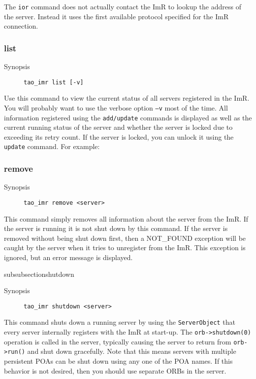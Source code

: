 \begin{itemize}
{\begin{itemize}
{{The {\tt ior} command does not actually contact the ImR to lookup the address 
of the server. Instead it uses the first available protocol specified for the 
ImR connection.

\subsubsection{list}

\begin{description}
    \item [Synopsis] {\tt tao\_imr list [-v]}
\end{description}

Use this command to view the current status of all servers registered 
in the ImR. You will probably want to use the verbose option {\tt–v}
 most of the time. All information registered using the {\tt add/update} 
commands is displayed as well as the current running status of the 
server and whether the server is locked due to exceeding its retry count. 
If the server is locked, you can unlock it using the {\tt update} command. 
For example:


\subsubsection{remove}

\begin{description}
    \item [Synopsis] {\tt tao\_imr remove <server>}
\end{description}

This command simply removes all information about the server from the ImR. 
If the server is running it is not shut down by this command. If the server is 
removed without being shut down first, then a NOT_FOUND exception will 
be caught by the server when it tries to unregister from the ImR. This exception 
is ignored, but an error message is displayed.

subsubsection{shutdown}

\begin{description}
    \item [Synopsis] {\tt tao\_imr shutdown <server>}
\end{description}

This command shuts down a running server by using the {\tt ServerObject} 
that every server internally registers with the ImR at start-up. The 
{\tt orb->shutdown(0)} operation is called in the server, typically causing 
the server to return from {\tt orb->run()} and shut down gracefully. Note 
that this means servers with multiple persistent POAs can be shut down 
using any one of the POA names. If this behavior is not desired, then you 
should use separate ORBs in the server. 

}}
\end{itemize}}
\end{itemize}
